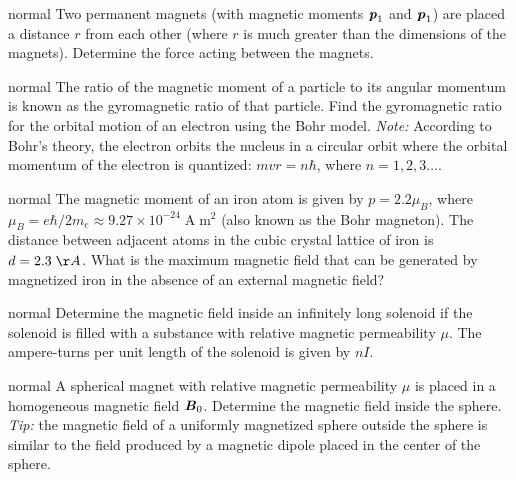 \hypertarget{P127}{}
\begin{solution}{normal} %
Two permanent magnets (with magnetic moments $\textbf{\textit{p}}_1$ and $\textbf{\textit{p}}_1$) are placed a distance $r$ from each other (where $r$ is much greater than the dimensions of the magnets). Determine the force acting between the magnets.
\end{solution}

\hypertarget{P128}{}
\begin{solution}{normal} %
The ratio of the magnetic moment of a particle to its angular momentum is known as the gyromagnetic ratio of that particle. Find the gyromagnetic ratio for the orbital motion of an electron using the Bohr model. \textit{Note:} According to Bohr's theory, the electron orbits the nucleus in a circular orbit where the orbital momentum of the electron is quantized: $mvr=n\hbar$, where $n=1,2,3\dots$.
\end{solution}

\hypertarget{P129}{}
\begin{solution}{normal} %
The magnetic moment of an iron atom is given by $p=2.2\mu_B$, where $\mu_B= e\hbar/2m_e\approx9.27\times10^{-24}\;\text{A}\;\text{m}^2$ (also known as the Bohr magneton). The distance between adjacent atoms in the cubic crystal lattice of iron is $d=2.3\;\AA$. What is the maximum magnetic field that can be generated by magnetized iron in the absence of an external magnetic field?
\end{solution}

\hypertarget{P130}{}
\begin{solution}{normal} %
Determine the magnetic field inside an infinitely long solenoid if the solenoid is filled with a substance with relative magnetic permeability $\mu$. The ampere-turns per unit length of the solenoid is given by $nI$.
\end{solution}

\hypertarget{P131}{}
\begin{solution}{normal} %
A spherical magnet with relative magnetic permeability $\mu$ is placed in a homogeneous magnetic field $\textbf{\textit{B}}_0$. Determine the magnetic field inside the sphere. \textit{Tip:} the magnetic field of a uniformly magnetized sphere outside the sphere is similar to the field produced by a magnetic dipole placed in the center of the sphere.
\end{solution}

